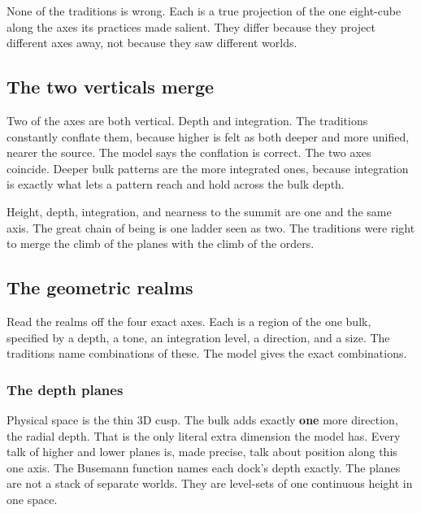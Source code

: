 \begin{result}
None of the traditions is wrong. Each is a true projection of the one
eight-cube along the axes its practices made salient. They differ because
they project different axes away, not because they saw different worlds.
\end{result}

\subsection{The two verticals merge}

Two of the axes are both vertical. Depth and integration. The traditions
constantly conflate them, because higher is felt as both deeper and more
unified, nearer the source. The model says the conflation is correct. The
two axes coincide. Deeper bulk patterns are the more integrated ones,
because integration is exactly what lets a pattern reach and hold across the
bulk depth.

\begin{principle}
Height, depth, integration, and nearness to the summit are one and the same
axis. The great chain of being is one ladder seen as two. The traditions
were right to merge the climb of the planes with the climb of the orders.
\end{principle}

\subsection{The geometric realms}

Read the realms off the four exact axes. Each is a region of the one bulk,
specified by a depth, a tone, an integration level, a direction, and a
size. The traditions name combinations of these. The model gives the exact
combinations.

\subsubsection{The depth planes}

Physical space is the thin 3D cusp. The bulk adds exactly \textbf{one} more
direction, the radial depth. That is the only literal extra dimension the
model has. Every talk of higher and lower planes is, made precise, talk
about position along this one axis. The Busemann function names each dock's
depth exactly. The planes are not a stack of separate worlds. They are
level-sets of one continuous height in one space.

